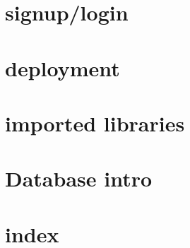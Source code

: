 \documentclass{article}
\begin{document}
\cleardoublepage



\section{signup/login}
\cleardoublepage



\section{deployment}
\cleardoublepage



\section{imported libraries}
\cleardoublepage

\section{Database intro}
\cleardoublepage

\section{}
\cleardoublepage

\section{}
\cleardoublepage

\section{}
\cleardoublepage

\section{}
\cleardoublepage

\section{}
\cleardoublepage

\section{}
\cleardoublepage



\section{index}
\cleardoublepage
\end{document}
